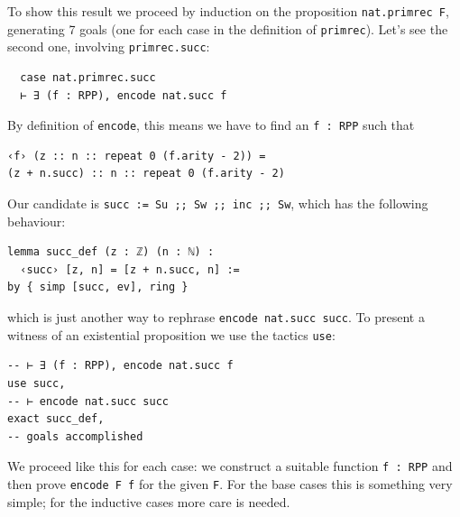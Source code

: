 \documentclass{book}
\theoremstyle{definition}
\theoremstyle{remark}
\theoremstyle{plain}
\begin{document}
To show this result we proceed by induction on the proposition \lstinline{nat.primrec F},
generating 7 goals (one for each case in the definition of \lstinline{primrec}).
Let's see the second one, involving \lstinline{primrec.succ}:
\begin{lstlisting}
  case nat.primrec.succ
  ⊢ ∃ (f : RPP), encode nat.succ f
\end{lstlisting}
By definition of \lstinline{encode},
this means we have to find an \lstinline{f : RPP} such that
\begin{lstlisting}
‹f› (z :: n :: repeat 0 (f.arity - 2)) =
(z + n.succ) :: n :: repeat 0 (f.arity - 2)
\end{lstlisting}
Our candidate is \lstinline{succ := Su ;; Sw ;; inc ;; Sw}, which has the following behaviour:
\begin{lstlisting}
lemma succ_def (z : ℤ) (n : ℕ) :
  ‹succ› [z, n] = [z + n.succ, n] :=
by { simp [succ, ev], ring }
\end{lstlisting}
which is just another way to rephrase \lstinline{encode nat.succ succ}.
To present a witness of an existential proposition we use the tactics \lstinline{use}:
\begin{lstlisting}
-- ⊢ ∃ (f : RPP), encode nat.succ f
use succ,
-- ⊢ encode nat.succ succ
exact succ_def,
-- goals accomplished
\end{lstlisting}

We proceed like this for each case:
we construct a suitable function \lstinline{f : RPP}
and then prove \lstinline{encode F f} for the given \lstinline{F}.
For the base cases this is something very simple; for the inductive cases more care is needed.
\end{document}
